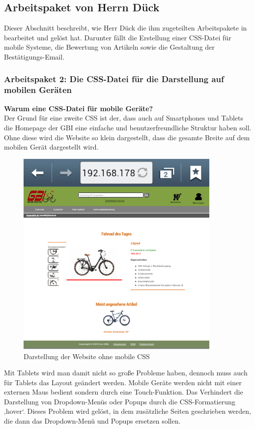 \newpage
\subsection{Arbeitspaket von Herrn Dück}

Dieser Abschnitt beschreibt, wie Herr Dück die ihm zugeteilten Arbeitspakete in bearbeitet und gelöst hat. Darunter fällt die Erstellung einer CSS-Datei für mobile Systeme, die Bewertung von Artikeln sowie die Gestaltung der Bestätigungs-Email.


\subsubsection{Arbeitspaket 2: Die CSS-Datei für die Darstellung auf mobilen Geräten}

\textbf{Warum eine CSS-Datei für mobile Geräte?}
\\
Der Grund für eine zweite CSS ist der, dass auch auf Smartphones und Tablets die Homepage der GBI eine einfache und benutzerfreundliche Struktur haben soll. Ohne diese wird die Website so klein dargestellt, dass die gesamte Breite auf dem mobilen Gerät dargestellt wird.

\begin{figure}[H]
\begin{center}
\includegraphics[width=10cm]{Bilder/Michael_Abbildung1-DarstellungDerWebsiteOhneMobileCSS.png}
\end{center}
\caption{Darstellung der Website ohne mobile CSS}
\end{figure}

Mit Tablets wird man damit nicht so große Probleme haben, dennoch muss auch für Tablets das Layout geändert werden. 
Mobile Geräte werden nicht mit einer externen Maus bedient sondern durch eine Touch-Funktion. Das Verhindert die Darstellung von Dropdown-Menüs oder Popups durch die CSS-Formatierung ‚hover‘. Dieses Problem wird gelöst, in dem zusätzliche Seiten geschrieben werden, die dann das Dropdown-Menü und Popups ersetzen sollen.

